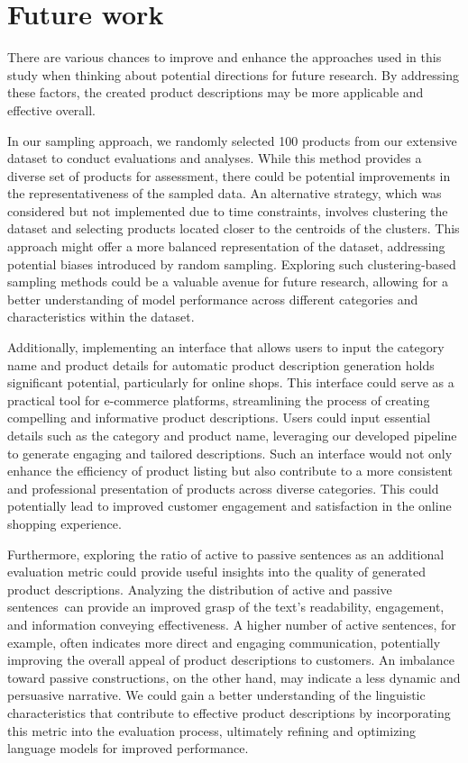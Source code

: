 \section{Future work}

There are various chances to improve and enhance the approaches used in this study when thinking about potential directions for future research. By addressing these factors, the created product descriptions may be more applicable and effective overall.

In our sampling approach, we randomly selected 100 products from our extensive dataset to conduct evaluations and analyses. While this method provides a diverse set of products for assessment, there could be potential improvements in the representativeness of the sampled data. An alternative strategy, which was considered but not implemented due to time constraints, involves clustering the dataset and selecting products located closer to the centroids of the clusters. This approach might offer a more balanced representation of the dataset, addressing potential biases introduced by random sampling. Exploring such clustering-based sampling methods could be a valuable avenue for future research, allowing for a better understanding of model performance across different categories and characteristics within the dataset.

Additionally, implementing an interface that allows users to input the category name and product details for automatic product description generation holds significant potential, particularly for online shops. This interface could serve as a practical tool for e-commerce platforms, streamlining the process of creating compelling and informative product descriptions. Users could input essential details such as the category and product name, leveraging our developed pipeline to generate engaging and tailored descriptions. Such an interface would not only enhance the efficiency of product listing but also contribute to a more consistent and professional presentation of products across diverse categories. This could potentially lead to improved customer engagement and satisfaction in the online shopping experience.

Furthermore, exploring the ratio of active to passive sentences as an additional evaluation metric could provide useful insights into the quality of generated product descriptions. Analyzing the distribution of active and passive sentences can provide an improved grasp of the text's readability, engagement, and information conveying effectiveness. A higher number of active sentences, for example, often indicates more direct and engaging communication, potentially improving the overall appeal of product descriptions to customers. An imbalance toward passive constructions, on the other hand, may indicate a less dynamic and persuasive narrative. We could gain a better understanding of the linguistic characteristics that contribute to effective product descriptions by incorporating this metric into the evaluation process, ultimately refining and optimizing language models for improved performance.

